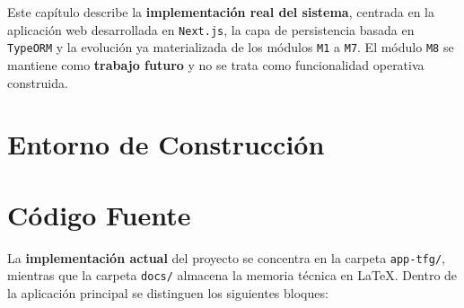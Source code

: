 Este capítulo describe la \textbf{implementación real del sistema}, centrada en la aplicación web desarrollada en \texttt{Next.js}, la capa de persistencia basada en \texttt{TypeORM} y la evolución ya materializada de los módulos \texttt{M1} a \texttt{M7}. El módulo \texttt{M8} se mantiene como \textbf{trabajo futuro} y no se trata como funcionalidad operativa construida.

\section{Entorno de Construcción}
\label{sec:ConstructionEnvironment}


\section{Código Fuente}

La \textbf{implementación actual} del proyecto se concentra en la carpeta \texttt{app-tfg/}, mientras que la carpeta \texttt{docs/} almacena la memoria técnica en \LaTeX. Dentro de la aplicación principal se distinguen los siguientes bloques:

